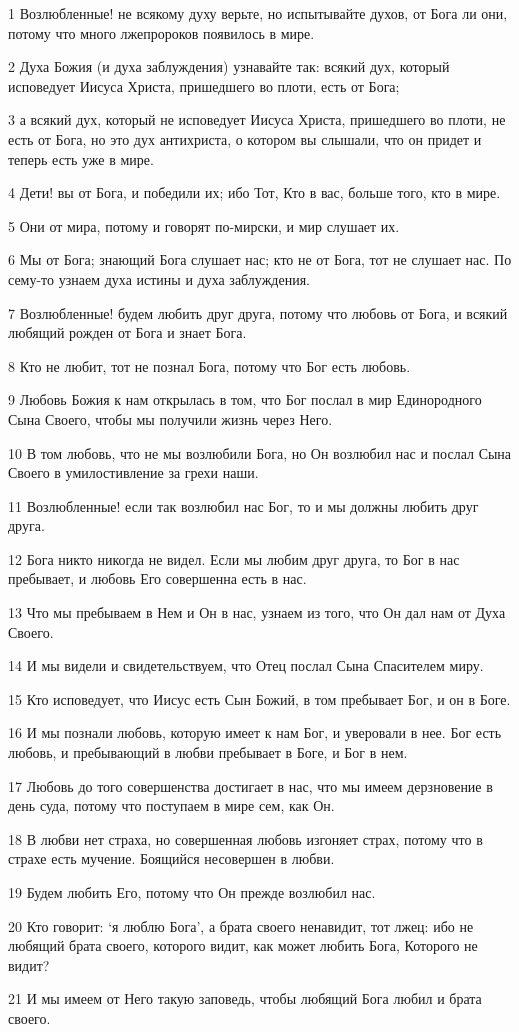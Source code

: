 \par 1 Возлюбленные! не всякому духу верьте, но испытывайте духов, от Бога ли они, потому что много лжепророков появилось в мире.
\par 2 Духа Божия (и духа заблуждения) узнавайте так: всякий дух, который исповедует Иисуса Христа, пришедшего во плоти, есть от Бога;
\par 3 а всякий дух, который не исповедует Иисуса Христа, пришедшего во плоти, не есть от Бога, но это дух антихриста, о котором вы слышали, что он придет и теперь есть уже в мире.
\par 4 Дети! вы от Бога, и победили их; ибо Тот, Кто в вас, больше того, кто в мире.
\par 5 Они от мира, потому и говорят по-мирски, и мир слушает их.
\par 6 Мы от Бога; знающий Бога слушает нас; кто не от Бога, тот не слушает нас. По сему-то узнаем духа истины и духа заблуждения.
\par 7 Возлюбленные! будем любить друг друга, потому что любовь от Бога, и всякий любящий рожден от Бога и знает Бога.
\par 8 Кто не любит, тот не познал Бога, потому что Бог есть любовь.
\par 9 Любовь Божия к нам открылась в том, что Бог послал в мир Единородного Сына Своего, чтобы мы получили жизнь через Него.
\par 10 В том любовь, что не мы возлюбили Бога, но Он возлюбил нас и послал Сына Своего в умилостивление за грехи наши.
\par 11 Возлюбленные! если так возлюбил нас Бог, то и мы должны любить друг друга.
\par 12 Бога никто никогда не видел. Если мы любим друг друга, то Бог в нас пребывает, и любовь Его совершенна есть в нас.
\par 13 Что мы пребываем в Нем и Он в нас, узнаем из того, что Он дал нам от Духа Своего.
\par 14 И мы видели и свидетельствуем, что Отец послал Сына Спасителем миру.
\par 15 Кто исповедует, что Иисус есть Сын Божий, в том пребывает Бог, и он в Боге.
\par 16 И мы познали любовь, которую имеет к нам Бог, и уверовали в нее. Бог есть любовь, и пребывающий в любви пребывает в Боге, и Бог в нем.
\par 17 Любовь до того совершенства достигает в нас, что мы имеем дерзновение в день суда, потому что поступаем в мире сем, как Он.
\par 18 В любви нет страха, но совершенная любовь изгоняет страх, потому что в страхе есть мучение. Боящийся несовершен в любви.
\par 19 Будем любить Его, потому что Он прежде возлюбил нас.
\par 20 Кто говорит: `я люблю Бога', а брата своего ненавидит, тот лжец: ибо не любящий брата своего, которого видит, как может любить Бога, Которого не видит?
\par 21 И мы имеем от Него такую заповедь, чтобы любящий Бога любил и брата своего.

